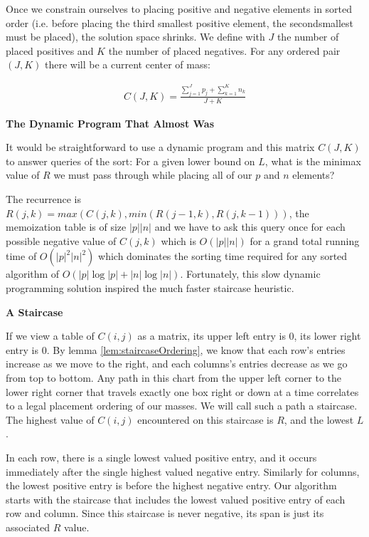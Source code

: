 Once we constrain ourselves to placing positive and negative elements in sorted order (i.e. before placing the third smallest positive element, the secondsmallest must be placed), the solution space shrinks.  We define with $J$ the number of placed positives and $K$ the number of placed negatives. For any ordered pair $(J,K)$ there will be a current center of mass:

\begin{align*} 
C(J,K) = \frac{\sum_{j=1}^{J} p_j + \sum_{k=1}^{K} n_k }{J+K}
\end{align*}

\textbf{The Dynamic Program That Almost Was}

It would be straightforward to use a dynamic program and this matrix $C(J,K)$ to answer queries of the sort: For a given lower bound on $L$, what is the minimax value of $R$ we must pass through while placing all of our $p$ and $n$ elements?

The recurrence is $R(j,k) = max( C(j,k), min( R(j-1,k), R(j,k-1) ) )$, the memoization table is of size $|p||n|$ and we have to ask this query once for each possible negative value of $C(j,k)$ which is $O(|p||n|)$ for a grand total running time of $O(|p|^2 |n|^2)$ which dominates the sorting time required for any sorted algorithm of $O(|p| \log |p| + |n| \log |n|)$.  Fortunately, this slow dynamic programming solution inspired the much faster staircase heuristic.

\textbf{A Staircase}

If we view a table of $C(i,j)$ as a matrix, its upper left entry is $0$, its lower right entry is $0$.  By lemma \ref{lem:staircaseOrdering}, we know that each row's entries increase as we move to the right, and each columns's entries decrease as we go from top to bottom.  Any path in this chart from the upper left corner to the lower right corner that travels exactly one box right or down at a time correlates to a legal placement ordering of our masses.  We will call such a path a staircase. The highest value of $C(i,j)$ encountered on this staircase is $R$, and the lowest $L$.  

In each row, there is a single lowest valued positive entry, and it occurs immediately after the single highest valued negative entry.  Similarly for columns, the lowest positive entry is before the highest negative entry.  Our algorithm starts with the staircase that includes the lowest valued positive entry of each row and column.  Since this staircase is never negative, its span is just its associated $R$ value.

